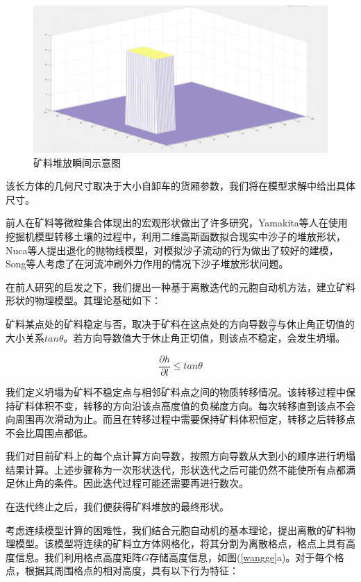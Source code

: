 \documentclass{my_paper}
\begin{document}
\begin {figure}[h]
\centering %
\includegraphics[width=\textwidth]{heap.png}
\caption{矿料堆放瞬间示意图} %
\label{heap}
\end {figure}

该长方体的几何尺寸取决于大小自卸车的货厢参数，我们将在模型求解中给出具体尺寸。

前人在矿料等微粒集合体现出的宏观形状做出了许多研究，Yamakita\cite{waji}等人在使用挖掘机模型转移土壤的过程中，利用二维高斯函数拟合现实中沙子的堆放形状，Nuca\cite{paowuxian}等人提出退化的抛物线模型，对模拟沙子流动的行为做出了较好的建模，Song\cite{hesha}等人考虑了在河流冲刷外力作用的情况下沙子堆放形状问题。

在前人研究的启发之下，我们提出一种基于离散迭代的元胞自动机方法，建立矿料形状的物理模型。其理论基础如下：

矿料某点处的矿料稳定与否，取决于矿料在这点处的方向导数$\frac{\partial h}{\partial l}$与休止角正切值的大小关系$tan\theta$。若方向导数值大于休止角正切值，则该点不稳定，会发生坍塌。

\begin{equation}
    \frac{\partial h}{\partial l}\leq tan\theta
\end{equation}

我们定义坍塌为矿料不稳定点与相邻矿料点之间的物质转移情况。该转移过程中保持矿料体积不变，转移的方向沿该点高度值的负梯度方向。每次转移直到该点不会向周围再次滑动为止。而且在转移过程中需要保持矿料体积恒定，转移之后转移点不会比周围点都低。

我们对目前矿料上的每个点计算方向导数，按照方向导数从大到小的顺序进行坍塌结果计算。上述步骤称为一次形状迭代，形状迭代之后可能仍然不能使所有点都满足休止角的条件。因此迭代过程可能还需要再进行数次。

在迭代终止之后，我们便获得矿料堆放的最终形状。

考虑连续模型计算的困难性，我们结合元胞自动机的基本理论，提出离散的矿料物理模型。该模型将连续的矿料立方体网格化，将其分割为离散格点，格点上具有高度信息。我们利用格点高度矩阵$G$存储高度信息，如图(\ref{wangge}a)。对于每个格点，根据其周围格点的相对高度，具有以下行为特征：
\end{document}
